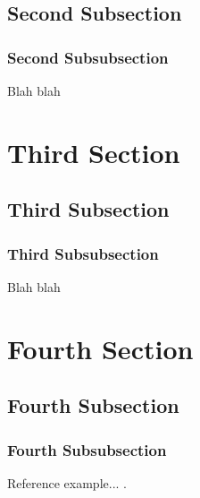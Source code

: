 \documentclass[11pt]{book}
\begin{document}
\subsection{Second Subsection}

\subsubsection{Second Subsubsection}

Blah blah

\section{Third Section}

\subsection{Third Subsection}

\subsubsection{Third Subsubsection}

Blah blah

\section{Fourth Section}

\subsection{Fourth Subsection}

\subsubsection{Fourth Subsubsection}

Reference example... \cite{Tsa2006}.
\end{document}
